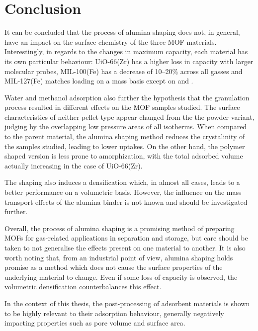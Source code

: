 
\pagebreak
\FloatBarrier%

\section{Conclusion}

It can be concluded that the process of alumina shaping does not, in 
general, have an impact on the surface chemistry of the three MOF
materials. Interestingly, in regards to the changes in maximum capacity,
each material has its own particular behaviour: UiO-66(Zr) has a 
higher loss in capacity with larger molecular probes, MIL-100(Fe) 
has a decrease of 10--20\% across all gasses and MIL-127(Fe) matches
loading on a mass basis except on  and .

Water and methanol adsorption also further the hypothesis that 
the granulation process resulted in different
effects on the MOF samples studied. The surface 
characteristics of neither pellet type appear changed from the 
the powder variant, judging by the overlapping low pressure
areas of all isotherms. When compared to the parent material,
the alumina shaping method reduces 
the crystalinity of the samples studied, leading to lower uptakes.
On the other hand, the polymer shaped version is less prone to
amorphization, with the total adsorbed volume actually increasing
in the case of UiO-66(Zr).

The shaping also induces a densification which, in almost all cases,
leads to a better performance on a volumetric basis. However, the 
influence on the mass transport effects of the alumina binder is 
not known and should be investigated further. 

Overall, the process of alumina shaping is a promising method of 
preparing MOFs for gas-related applications in separation and 
storage, but care should be taken to not generalise the effects
present on one material to another. It is also worth noting that,
from an industrial point of view, alumina shaping holds promise 
as a method which does not cause the surface properties of 
the underlying material to change. Even if some loss of capacity
is observed, the volumetric densification counterbalances this effect. 

In the context of this thesis, the post-processing of adsorbent
materials is shown to be highly relevant to their adsorption behaviour,
generally negatively impacting properties such as pore volume and surface
area. 

\pagebreak
